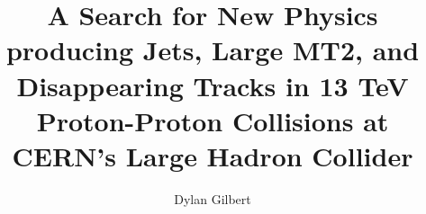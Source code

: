 %
%
%
%




\title{A Search for New Physics producing Jets, Large MT2, and Disappearing Tracks in 13 TeV Proton-Proton Collisions at CERN's Large Hadron Collider}

\author{Dylan Gilbert}
\degreeyear{\the\year}




%



